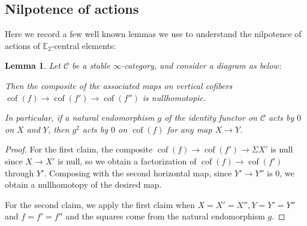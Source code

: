 \documentclass[12 pt]{amsart}
\theoremstyle{plain}
\newtheorem{lemma}[theorem]{Lemma}
\theoremstyle{definition}
\theoremstyle{remark}
\numberwithin{equation}{section}
\newcommand \cC{{\mathcal C}}
\DeclareMathOperator\cof{cof}
\newcommand\EE{\mathbb{E}}
\begin{document}
\subsection{Nilpotence of actions}
\label{subsection:nilpotence}
Here we record a few well known lemmas we use to understand the nilpotence of actions of $\EE_2$-central elements:

\begin{lemma}\label{lemma:squarecoflemma}
	Let $\cC$ be a stable $\infty$-category, and consider a diagram as below:
	\begin{center}
		\end{center}
	Then the composite of the associated maps on vertical cofibers $\cof(f) \to \cof(f') \to \cof(f'')$ is nullhomotopic. 
	
	In particular, if a natural endomorphism $g$ of the identity functor on $\cC$ acts by $0$ on $X$ and $Y$, then $g^2$ acts by $0$ on $\cof(f)$ for any map $X \to Y$.
\end{lemma}
\begin{proof}
	For the first claim, the composite $\cof(f) \to \cof(f') \to \Sigma X'$ is null since $X \to X'$ is null, so we obtain a factorization of $\cof(f) \to \cof(f')$ through $Y'$. Composing with the second horizontal map, since $Y' \to Y''$ is $0$, we obtain a nullhomotopy of the desired map.
	
	For the second claim, we apply the first claim when $X = X' = X'', Y =
	Y' = Y''$ and $f = f' = f''$ and the squares come from the natural endomorphism $g$.
\end{proof}
\end{document}
